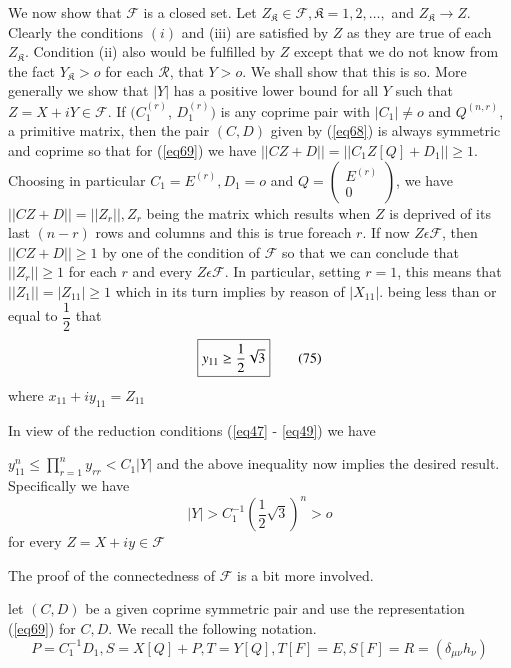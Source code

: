 We now show that $\mathcal{F}$ is a closed set. Let $Z_\mathfrak{K} \in
\mathcal{F}, \mathfrak{K}=1, 2, \ldots ,$ and $Z_\mathfrak{K} \to
Z$. Clearly the conditions $(i)$ and (iii) are satisfied by $Z$ as
they are true of each $Z_\mathfrak{K}$. Condition (ii) also would be
fulfilled by $Z$ except that we do not know from the fact
$Y_\mathfrak{K} > o$ for each $\mathscr{R}$, that $Y > o$. We shall
show that this is so. More generally we show that $|Y|$ has a positive
lower bound for all $Y$ such that $Z=X + i Y \in \mathcal{F}$. If
$(C^{(r)}_1$, $D^{(r)}_1)$ is any coprime pair with $|C_1 | \neq o$ and
$Q^{(n, r)}$, a primitive matrix, then the pair $(C, D)$ given by
(\ref{eq68}) is always symmetric and coprime so that for (\ref{eq69}) we have
$||CZ  + D|| = ||C_1Z[Q] + D_1|| \geq 1$. Choosing in particular $C_1
= E^{(r)},D_1 = o$ and $Q = \begin{pmatrix} E^{(r)} \\ 0 \end{pmatrix}$,
we have $|| CZ + D || = || Z_r ||, Z_r$ being the matrix which results
when $Z$ is deprived of its last $(n - r)$ rows and columns and this
is true for\pageoriginale each $r$. If now $Z \epsilon \mathcal{F}$,
then $|| CZ+D|| 
\geq 1$ by one of the condition of $\mathcal{F}$ so that we can
conclude that $|| Z_r || \geq 1$ for each $r$ and every $Z \epsilon
\mathcal{F}$. In particular, setting $r=1$, this means that $|| Z_1 ||
= |Z_{11}|\geq 1$ which in its turn implies by reason of $|
X_{11}|$. being less than or equal to $\dfrac{1}{2}$ that  
\begin{equation*}
\text{\fbox{$y_{11} \geq \dfrac{1}{2}\sqrt{3}$}}\tag{75}\label{eq75}   
\end{equation*}
where $x_{11} + i y_{11} = Z_{11}$

In view of the reduction conditions (\ref{eq47} - \ref{eq49}) we have

$y^n_{11} \leq \prod\limits^{n}_{r=1}y_{rr} < C_1 |Y| $ and the above
inequality now implies the desired result. Specifically we have  
\begin{equation*}
|Y| > C^{-1}_1 (\frac{1}{2}\sqrt{3})^n > o \tag{76}\label{eq76}  
\end{equation*}
for every $Z = X + i y \in \mathcal{F}$

The proof of the connectedness of $\mathcal{F}$ is a bit more involved.

let $(C, D)$ be a given coprime symmetric pair and use the
representation (\ref{eq69}) for $C, D$. We recall the following notation. 
$$
P = C^{-1}_1D_1, S = X[Q] + P, T = Y[Q], T [F] = E, S[F] = R =
(\delta_{\mu \nu}h_\nu)
$$ 

